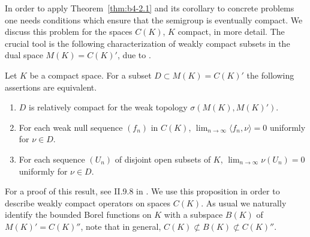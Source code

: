In order to apply Theorem~\ref{thm:b4-2.1} and its corollary to concrete problems one
needs conditions which ensure that the semigroup is eventually compact.
We discuss this problem for the spaces $C(K)$, $K$ compact, in
more detail.
The crucial tool is the following characterization of
weakly compact subsets in the dual space $M(K) = C(K)'$, due to
\textcite{grothendieck:1953}.
\begin{proposition}\label{prop:b4-2.3}
	Let $K$ be a compact space.
	For a subset $D \subset M(K) = C(K)'$ the following assertions are equivalent.
	
	\begin{enumerate}[\upshape (a)]
		\item 
		$D$ is relatively compact for the weak topology $\sigma(M(K),M(K)')$.
	
		\item 
		For each weak null sequence $(f_n)$ in $C(K)$, $\lim_{n\to\infty}\langle f_n,\nu \rangle = 0$ uniformly for $\nu \in D$.
	
		\item 
		For each sequence $(U_n)$ of disjoint open subsets of\/ $K$, 
		$\lim_{n\to\infty}\nu(U_n) = 0$ uniformly for $\nu \in D$.
		\end{enumerate}
\end{proposition}
For a proof of this result, see \eg II.9.8 in \textcite{schaefer:1974}.
We use this proposition in order to describe weakly compact operators on spaces $C(K)$.
As usual we naturally identify the bounded Borel functions on $K$ with a subspace $B(K)$ of\/ $M(K)' = C(K)''$, note that in
general, $C(K) \not\subset B(K) \not\subset C(K)''$.

